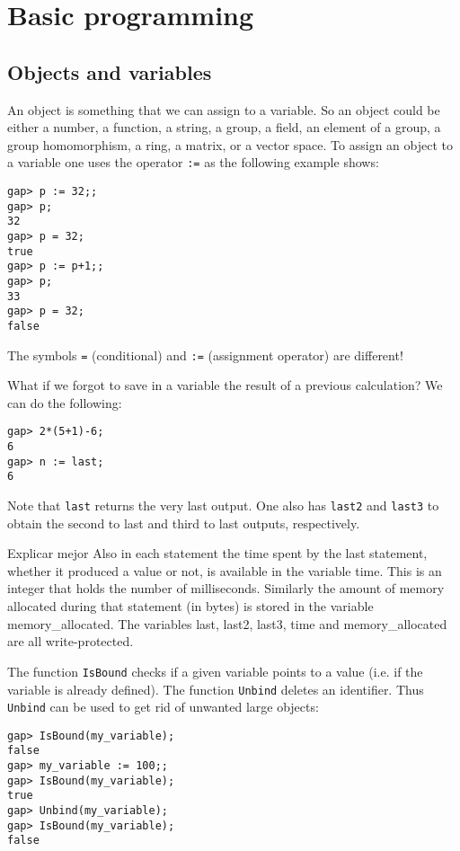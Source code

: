 \section{Basic programming}
\label{programming}

\subsection{Objects and variables}

An object is something that we can assign to a variable. So an object could be
either a number, a function, a string, a group, a field, an element of a group, a group
homomorphism, a ring, a matrix, or a vector space. To assign an object to a
variable one uses the operator \lstinline{:=} as the following example shows:
\begin{lstlisting}
gap> p := 32;;
gap> p;
32
gap> p = 32;
true
gap> p := p+1;;
gap> p;
33
gap> p = 32;
false
\end{lstlisting}

\begin{remark}
  The symbols \lstinline{=} (conditional) and \lstinline{:=} (assignment
  operator) are different!
\end{remark}

\begin{remark}
What if we forgot to save in a variable the result of a previous calculation? We
can do the following:
\begin{lstlisting}
gap> 2*(5+1)-6;                                             
6
gap> n := last;
6
\end{lstlisting}
Note that \lstinline{last} returns the very last output. 
One also has \lstinline{last2} and \lstinline{last3} to obtain the second to last 
and third to last outputs, respectively. 
\end{remark}

{\color{red} Explicar mejor
Also in each statement the time spent by the last statement, whether it produced a value or not, is available in the variable time. This is an integer that holds the number of milliseconds. Similarly the amount of memory allocated during that statement (in bytes) is stored in the variable memory\_allocated. The variables last, last2, last3, time and memory\_allocated are all write-protected.
}

The function \lstinline{IsBound} checks if 
a given variable points to a value (i.e. if the variable is already defined). 
The function \lstinline{Unbind} deletes an identifier.  
Thus \lstinline{Unbind} can be used 
to get rid of unwanted large objects:
\begin{lstlisting}
gap> IsBound(my_variable);
false
gap> my_variable := 100;;
gap> IsBound(my_variable);
true
gap> Unbind(my_variable);
gap> IsBound(my_variable);
false
\end{lstlisting}

